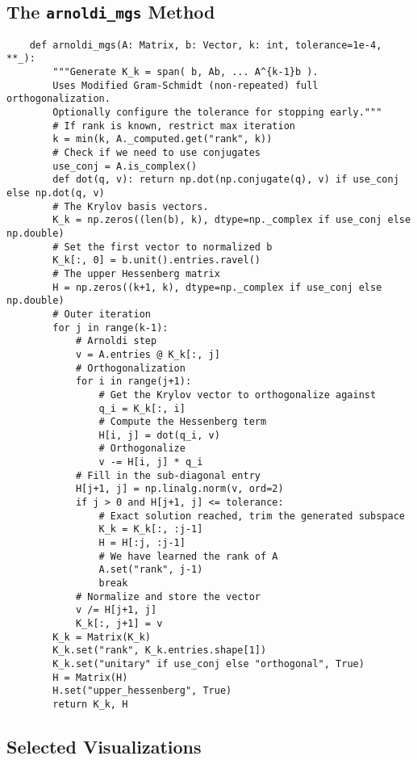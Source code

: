 \documentclass[12pt,a4paper]{article}
\newcommand{\ct}[1]{\texttt{#1}}
\begin{document}
\subsection{The \ct{arnoldi\_mgs} Method}
\label{code:arnoldi_mgs}
\begin{verbatim}
    def arnoldi_mgs(A: Matrix, b: Vector, k: int, tolerance=1e-4, **_):
        """Generate K_k = span( b, Ab, ... A^{k-1}b ).
        Uses Modified Gram-Schmidt (non-repeated) full orthogonalization.
        Optionally configure the tolerance for stopping early."""
        # If rank is known, restrict max iteration
        k = min(k, A._computed.get("rank", k))
        # Check if we need to use conjugates
        use_conj = A.is_complex()
        def dot(q, v): return np.dot(np.conjugate(q), v) if use_conj else np.dot(q, v)
        # The Krylov basis vectors.
        K_k = np.zeros((len(b), k), dtype=np._complex if use_conj else np.double)
        # Set the first vector to normalized b
        K_k[:, 0] = b.unit().entries.ravel()
        # The upper Hessenberg matrix
        H = np.zeros((k+1, k), dtype=np._complex if use_conj else np.double)
        # Outer iteration
        for j in range(k-1):
            # Arnoldi step
            v = A.entries @ K_k[:, j]
            # Orthogonalization
            for i in range(j+1):
                # Get the Krylov vector to orthogonalize against
                q_i = K_k[:, i]
                # Compute the Hessenberg term
                H[i, j] = dot(q_i, v)
                # Orthogonalize
                v -= H[i, j] * q_i
            # Fill in the sub-diagonal entry
            H[j+1, j] = np.linalg.norm(v, ord=2)
            if j > 0 and H[j+1, j] <= tolerance:
                # Exact solution reached, trim the generated subspace
                K_k = K_k[:, :j-1]
                H = H[:j, :j-1]
                # We have learned the rank of A
                A.set("rank", j-1)
                break
            # Normalize and store the vector
            v /= H[j+1, j]
            K_k[:, j+1] = v
        K_k = Matrix(K_k)
        K_k.set("rank", K_k.entries.shape[1])
        K_k.set("unitary" if use_conj else "orthogonal", True)
        H = Matrix(H)
        H.set("upper_hessenberg", True)
        return K_k, H
\end{verbatim}

\newpage
\subsection{Selected Visualizations}
\label{visualizations}
\end{document}
